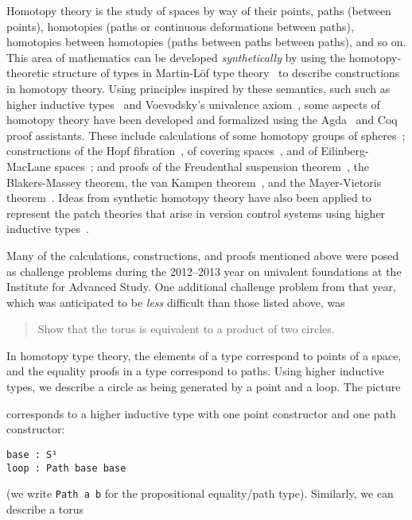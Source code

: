 

Homotopy theory is the study of spaces by way of their points, paths
(between points), homotopies (paths or continuous deformations between
paths), homotopies between homotopies (paths between paths between
paths), and so on.  This area of mathematics can be developed
\emph{synthetically} by using the homotopy-theoretic structure of types in
Martin-L\"of type
theory~\citep{hofmann98groupoid,lumsdaine09omega,vandenberggarner10groupoids,awodeywarren09identity,warren08thesis,gambinogarner08id,voevodsky11wollic}
to describe constructions in homotopy theory.  Using principles inspired
by these semantics, such such as higher inductive
types~\citep{lumsdaine+13hits,shulman11hitsblog,lumsdaine11hitsblog} and
Voevodsky's univalence
axiom~\citep{voevodsky11wollic,voevodsky+12simpluniv}, some aspects of
homotopy theory have been developed and formalized using the
Agda~\citep{norell07thesis} and Coq~\citep{inria06coqmanual} proof
assistants.  These include calculations of some homotopy groups of
spheres~\citep{ls13pi1s1,lb13pinsn,uf13hott-book}; constructions of the
Hopf fibration~\citep{uf13hott-book}, of covering
spaces~\citep{favonia-types}, and of Eilinberg-MacLane
spaces~\citep{lf14emspace}; and proofs of the Freudenthal suspension
theorem~\citep{uf13hott-book}, the Blakers-Massey theorem, the van
Kampen theorem~\citep{uf13hott-book}, and the Mayer-Vietoris
theorem~\citep{cavallo}.  Ideas from synthetic homotopy theory have also
been applied to represent the patch theories that arise in version
control systems using higher inductive types~\citep{amlh14patch}.

Many of the calculations, constructions, and proofs mentioned above were
posed as challenge problems during the 2012--2013 year on univalent
foundations at the Institute for Advanced Study.  One additional
challenge problem from that year, which was anticipated to be
\emph{less} difficult than those listed above, was
\begin{quote}
Show that the torus is equivalent to a product of two circles.
\end{quote}
In homotopy type theory, the elements of a type correspond to points of
a space, and the equality proofs in a type correspond to paths.  Using
higher inductive types, we describe a circle as being generated by a
point and a loop.  The picture
\begin{center}
\end{center}
corresponds to a higher inductive type with one point constructor and
one path constructor:
\begin{verbatim}
base : S¹
loop : Path base base
\end{verbatim}
(we write \verb|Path a b| for the propositional equality/path type).
Similarly, we can describe a torus

